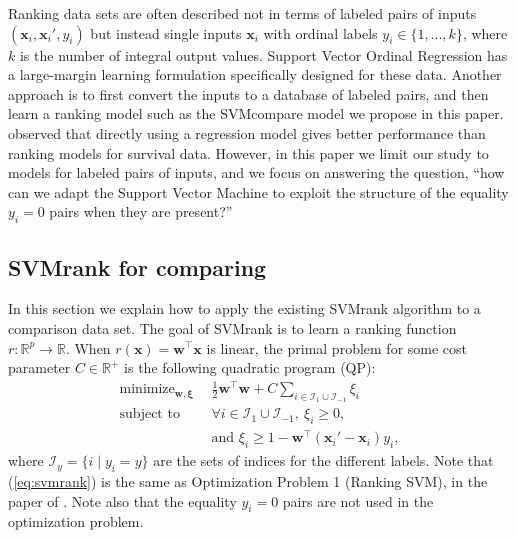 \documentclass[twoside,11pt]{article}
\newcommand{\changed}[1]{
  #1
}
\newcommand{\RR}{\mathbb R}
\DeclareMathOperator*{\minimize}{minimize}
\begin{document}
\changed{Ranking data sets are often described not in terms of labeled
  pairs of inputs $(\mathbf x_i, \mathbf x_i', y_i)$ but instead
  single inputs $\mathbf x_i$ with ordinal labels
  $y_i\in\{1,\dots,k\}$, where $k$ is the number of integral output
  values. Support Vector Ordinal Regression \citep{ordinal} has a
  large-margin learning formulation specifically designed for these
  data. Another approach is to first convert the inputs to a database
  of labeled pairs, and then learn a ranking model such as the
  SVMcompare model we propose in this paper. \citet{sv-survival}
  observed that directly using a regression model gives better
  performance than ranking models for survival data. However, in this
  paper we limit our study to models for labeled pairs of inputs, and
  we focus on answering the question, ``how can we adapt the Support
  Vector Machine to exploit the structure of the equality $y_i=0$
  pairs when they are present?''}


\subsection{SVMrank for comparing}
\label{sec:svmrank}
In this section we explain how to apply the existing SVMrank algorithm
to a comparison data set.  The goal of SVMrank is to learn a ranking
function $r:\RR^p \rightarrow \RR$. When $r(\mathbf x)=\mathbf
w^\intercal \mathbf x$ is linear, the primal problem for some cost
parameter $C\in\RR^+$ is the following quadratic program (QP):
\begin{equation}
  \begin{aligned}
    \minimize_{\mathbf w, \mathbf \xi}\ \ & \frac 1 2
    \mathbf w^\intercal \mathbf w
    + C \sum_{i\in \mathcal I_1\cup \mathcal I_{-1}} \xi_i \\
    \text{subject to}\ \ &
    \forall i\in \mathcal I_1\cup \mathcal I_{-1},\ \xi_i \geq 0,\\
    & \text{and }\xi_i \geq 1-\mathbf w^\intercal(\mathbf x_i'-\mathbf
    x_i)y_i,
  \end{aligned}
  \label{eq:svmrank}
\end{equation}
where $\mathcal I_y=\{i\mid y_i=y\}$ are the sets of indices for the different
labels. Note that (\ref{eq:svmrank}) is the same as Optimization
Problem 1 (Ranking SVM), in the paper of \citet{ranksvm}. Note also
that the equality $y_i=0$ pairs are not used in the optimization
problem.
\end{document}
